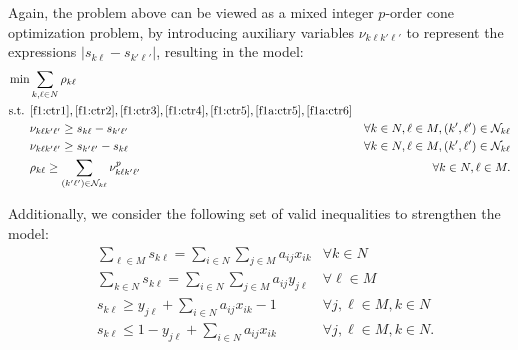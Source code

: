 \documentclass[a4paper,11pt, reqno]{amsart}
\def\N{\mathcal{N}}
\begin{document}
Again, the problem above can be viewed as a mixed integer $p$-order cone optimization problem, by introducing auxiliary variables $\nu_{k\ell k'\ell '}$ to represent the expressions $|s_{k\ell }-s_{k'\ell '}|$, resulting in the model:
\begin{align*}
\min & \sum_{k,\ell\in N} \rho_{k\ell } \\
\nonumber \mbox{s.t. } & \eqref{f1:ctr1}, \eqref{f1:ctr2}, \eqref{f1:ctr3}, \eqref{f1:ctr4}, \eqref{f1:ctr5},
\eqref{f1a:ctr5}, \eqref{f1a:ctr6}\\
    & \nu_{k\ell k'\ell '} \geq s_{k\ell }- s_{k'\ell '} &
    \forall k \in N, \ell  \in M, (k',\ell ') \in \mathcal{N}_{k\ell }\\
    & \nu_{k\ell k'\ell '} \geq s_{k'\ell '}-s_{k\ell } &
    \forall k \in N, \ell  \in M, (k',\ell ') \in \mathcal{N}_{k\ell }\\
    & \rho_{k\ell } \geq \sum_{(k'\ell ')\in \N_{k\ell }} \nu_{k\ell k'\ell '}^p & \forall k \in N, \ell \in M.\\
\end{align*}

Additionally, we consider the following set of valid inequalities to strengthen the model:
\begin{align*}
    & \sum_{\ell\in M} s_{k\ell } = \sum_{i\in N}\sum_{j\in M} a_{ij} x_{ik} & \forall k \in N\\
     & \sum_{k \in N} s_{k\ell } = \sum_{i\in N}\sum_{j\in M} a_{ij} y_{j\ell } & \forall \ell  \in M\\
    & s_{k\ell } \geq y_{j\ell } + \sum_{i\in N} a_{ij}x_{ik} -1 & 
    \forall j, \ell  \in M, k \in N \\
    & s_{k\ell }\le 1 - y_{j\ell } + \sum_{i \in N} a_{ij} x_{ik} & 
    \forall j,\ell  \in M, k \in N.
\end{align*}
\end{document}
